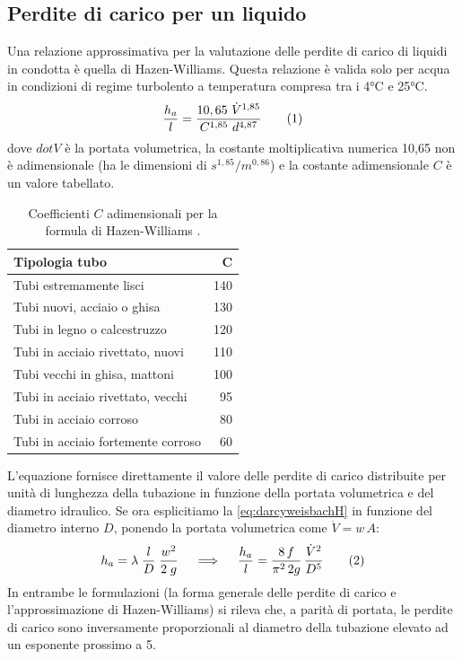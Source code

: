 \subsection{Perdite di carico per un liquido}
Una relazione approssimativa per la valutazione delle perdite di carico di liquidi in condotta è quella di Hazen-Williams.  Questa relazione è valida solo per acqua in condizioni di regime turbolento a temperatura compresa tra i 4°C e 25°C.
\[\frac{h_a}{l} = \frac{10,65\ \dot{V}^{1,85}}{C^{1,85}\ d^{4,87}} \addtag \label{eq:HW}\]
dove \(dot V\) è la portata volumetrica, la costante moltiplicativa numerica 10,65 non è adimensionale (ha le dimensioni di \(s^{1,85}/m^{0,86}\)) e la costante adimensionale \(C\) è un valore tabellato.
\begin{table}[htbp]
    \small
    \centering
    \begin{tabular}{|l|r|}
        \hline
        \textbf{Tipologia tubo} & \(\mathbf{C}\)\\
        \hline
             Tubi estremamente lisci & 140\\
        Tubi nuovi, acciaio o ghisa & 130\\
        Tubi in legno o calcestruzzo & 120\\
        Tubi in acciaio rivettato, nuovi & 110\\
        Tubi vecchi in ghisa, mattoni & 100\\
        Tubi in acciaio rivettato, vecchi & 95\\
        Tubi in acciaio corroso & 80\\
        Tubi in acciaio fortemente corroso & 60\\
        \hline
    \end{tabular}
    \label{tab:coefficientiHZ}
    \caption{Coefficienti $C$ adimensionali per la formula di Hazen-Williams \parencite{dimarcopaolo2006appunti}.}
\end{table}
L'equazione fornisce direttamente il valore delle perdite di carico distribuite per unità di lunghezza della tubazione in funzione della portata volumetrica e del diametro idraulico. Se ora esplicitiamo la \eqref{eq:darcyweisbachH} in funzione del diametro interno \(D\), ponendo la portata volumetrica come \(\dot{V} =w \, A\):
\[h_a = \lambda \; \frac{l}{D} \; \frac{w^2}{2 \; g} \quad \implies \quad \frac{h_a}{l}=\frac{8 \, f}{\pi^2 \, 2g} \, \frac{{\dot{V}}^2}{D^5} \addtag \label{eq:darcyweisbachespl} \]
In entrambe le formulazioni (la forma generale delle perdite di carico e l'approssimazione di Hazen-Williams) si rileva che, a parità di portata, le perdite di carico sono inversamente proporzionali al diametro della tubazione elevato ad un esponente prossimo a 5.

